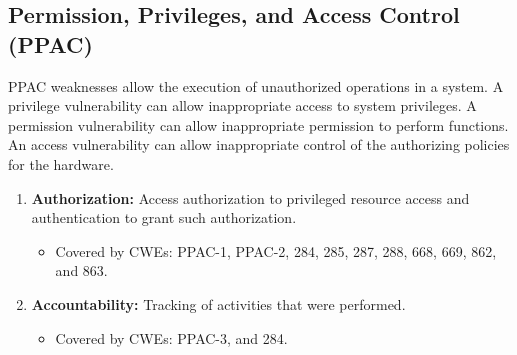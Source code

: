 \documentclass{article}
\begin{document}
\subsection{Permission, Privileges, and Access Control (PPAC)}
PPAC weaknesses allow the execution of unauthorized operations in a system. A privilege vulnerability can allow inappropriate access to system privileges. A permission vulnerability can allow inappropriate permission to perform functions. An access vulnerability can allow inappropriate control of the authorizing policies for the hardware.
\begin{enumerate}
    \item \textbf{Authorization:} Access authorization to privileged resource access and authentication to grant such authorization.
    \begin{itemize}
        \item Covered by CWEs: PPAC-1, PPAC-2, 284, 285, 287, 288, 668, 669, 862, and 863.
    \end{itemize}
    
    \item \textbf{Accountability:} Tracking of activities that were performed.
    \begin{itemize}
        \item Covered by CWEs: PPAC-3, and 284.
    \end{itemize}
\end{enumerate}
\end{document}
